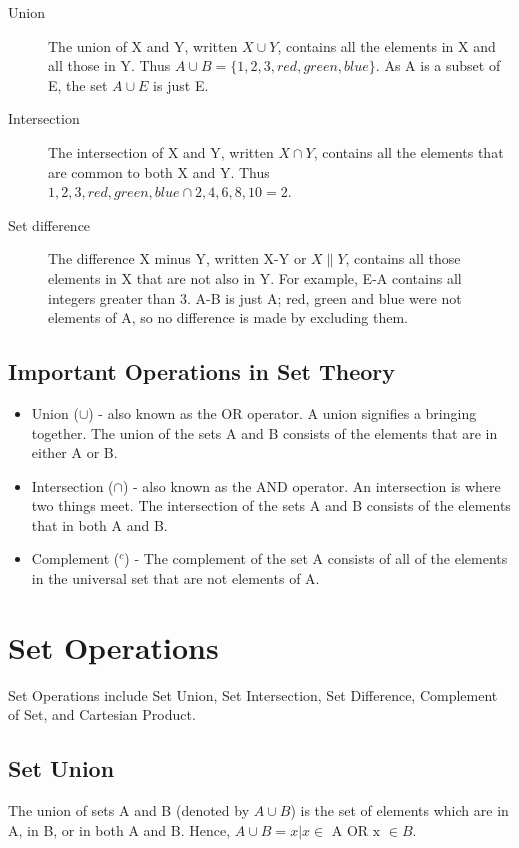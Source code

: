 \documentclass[11pt,a4paper,titlepage,oneside,openany]{article}
\numberwithin{equation}{section}
\numberwithin{algorithm}{section}
\numberwithin{figure}{section}
\numberwithin{table}{section}
\begin{document}
\begin{description}
\item[Union]
The union of X and Y, written $X\cup Y$, contains all the elements in X and all those in Y. Thus $A \cup B = \{1, 2, 3, red, green, blue\}$. 
As A is a subset of E, the set $A \cup E$ is just E.

\item[Intersection]

The intersection of X and Y, written $X \cap Y$, contains all the elements that are common to both X and Y. Thus ${1,2,3,red,green,blue} \cap {2,4,6,8,10} = {2}$.

\item[Set difference]

The difference X minus Y, written X-Y or $X\|Y$, contains all those elements in X that are not also in Y. For example, E-A contains all integers greater than 3. 
A-B is just A; red, green and blue were not elements of A, so no difference is made by excluding them.
\end{description}


\subsection{Important Operations in Set Theory}

\begin{itemize}
\item Union ($\cup$) - also known as the OR operator. A union signifies a bringing together. The union of the sets A and B consists of the elements that are in either A or B.
\item Intersection ($\cap$) - also known as the AND operator. An intersection is where two things meet. The intersection of the sets A and B consists of the elements that in both A and B.
\item Complement ($^{c}$) - The complement of the set A consists of all of the elements in the universal set that are not elements of A.
\end{itemize}


\section{Set Operations}
Set Operations include Set Union, Set Intersection, Set Difference, Complement of Set, and Cartesian Product.

\subsection{Set Union}
The union of sets A and B (denoted by $A \cup B$) is the set of elements which are in A, in B, or in both A and B. Hence, $A \cup B={x|x \in \mbox{ A OR x } \in B}$.
\end{document}
